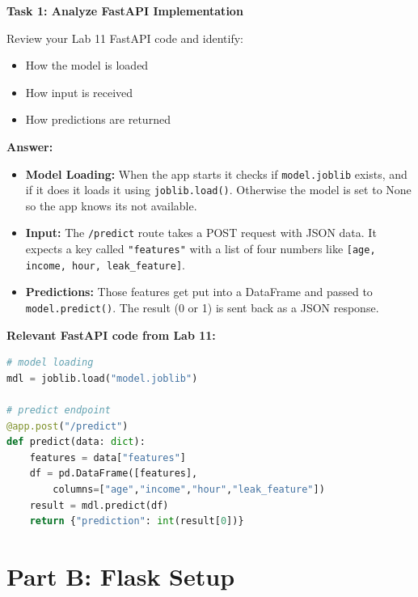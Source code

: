 \documentclass[12pt,a4paper]{article}
\begin{document}
\begin{tcolorbox}
\textbf{Task 1: Analyze FastAPI Implementation}

Review your Lab 11 FastAPI code and identify:
\begin{itemize}
\item How the model is loaded
\item How input is received
\item How predictions are returned
\end{itemize}

\textbf{Answer:}

\begin{itemize}
\item \textbf{Model Loading:} When the app starts it checks if \texttt{model.joblib} exists, and if it does it loads it using \texttt{joblib.load()}. Otherwise the model is set to None so the app knows its not available.
\item \textbf{Input:} The \texttt{/predict} route takes a POST request with JSON data. It expects a key called \texttt{"features"} with a list of four numbers like \texttt{[age, income, hour, leak\_feature]}.
\item \textbf{Predictions:} Those features get put into a DataFrame and passed to \texttt{model.predict()}. The result (0 or 1) is sent back as a JSON response.
\end{itemize}

\textbf{Relevant FastAPI code from Lab 11:}

\begin{lstlisting}[language=Python]
# model loading
mdl = joblib.load("model.joblib")

# predict endpoint
@app.post("/predict")
def predict(data: dict):
    features = data["features"]
    df = pd.DataFrame([features],
        columns=["age","income","hour","leak_feature"])
    result = mdl.predict(df)
    return {"prediction": int(result[0])}
\end{lstlisting}

\end{tcolorbox}

\vspace{24pt}


\section*{Part B: Flask Setup}
\end{document}
